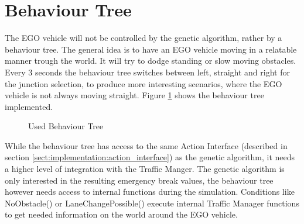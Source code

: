 \section{Behaviour Tree}
The EGO vehicle will not be controlled by the genetic algorithm, rather by a behaviour tree. The general idea is to have an EGO vehicle moving in a relatable manner trough the world. It will try to dodge standing or slow moving obstacles. Every 3 seconds the behaviour tree switches between left, straight and right for the junction selection, to produce more interesting scenarios, where the EGO vehicle is not always moving straight. Figure \ref{fig:implementation:bt} shows the behaviour tree implemented.

\begin{figure}[ht]
	\label{fig:implementation:bt}
	\centering
	\caption{Used Behaviour Tree}
\end{figure}

While the behaviour tree has access to the same Action Interface (described in section \ref{sect:implementation:action_interface}) as the genetic algorithm, it needs a higher level of integration with the Traffic Manger. The genetic algorithm is only interested in the resulting emergency break values, the behaviour tree however needs access to internal functions during the simulation. Conditions like NoObstacle() or LaneChangePossible() execute internal Traffic Manager functions to get needed information on the world around the EGO vehicle.


